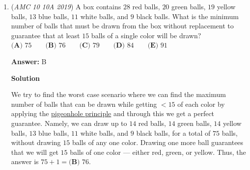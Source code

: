 \begin{enumerate}
 \textbf{Answer: }D



\textbf{Solution 1}

Let $A$ be the age of Ana and $B$ be the age of Bonita. Then,

 
 \[A-1 = 5(B-1)\]and
 \[A = B^2.\]

 Substituting the second equation into the first gives us

 
 \[B^2-1 = 5(B-1).\]

 By using difference of squares and dividing, $B=4.$ Moreover, $A=B^2=16.$

 The answer is $16-4 = \boxed{\textbf{(D) }12}$.

 



\textbf{Solution 2 (Guess and Check)}

Simple guess and check works. Start with all the square numbers - $1$, $4$, $9$, $16$, $25$, $36$, etc. (probably stop at around $100$ since at that point it wouldn't make sense). If Ana is $9$, then Bonita is $3$, so in the previous year, Ana's age was $4$ times greater than Bonita's. If Ana is $16$, then Bonita is $4$, and Ana's age was $5$ times greater than Bonita's in the previous year, as required. The difference in the ages is $16 - 4 = \boxed{\textbf{(D) }12}$.

 



\textbf{Solution 3 (Answer Choices)}

The second sentence of the problem says that Ana's age was once $5$ times Bonita's age. Therefore, the difference of the ages $n$ must be divisible by $4.$ The only answer choice which is divisible by $4$ is $\boxed{\textbf{(D) }12}$.

 


	\item (\textit{AMC 10 10A 2019}) A box contains $28$ red balls, $20$ green balls, $19$ yellow balls, $13$ blue balls, $11$ white balls, and $9$ black balls. What is the minimum number of balls that must be drawn from the box without replacement to guarantee that at least $15$ balls of a single color will be drawn$?$
$\textbf{(A) } 75 \qquad\textbf{(B) } 76 \qquad\textbf{(C) } 79 \qquad\textbf{(D) } 84 \qquad\textbf{(E) } 91$

 \textbf{Answer: }B



\textbf{Solution}

We try to find the worst case scenario where we can find the maximum number of balls that can be drawn while getting $<15$ of each color by applying the \href{https://artofproblemsolving.com/wiki/index.php?title=Pigeonhole\_principle}{pigeonhole principle} and through this we get a perfect guarantee. Namely, we can draw up to $14$ red balls, $14$ green balls, $14$ yellow balls, $13$ blue balls, $11$ white balls, and $9$ black balls, for a total of $75$ balls, without drawing $15$ balls of any one color. Drawing one more ball guarantees that we will get $15$ balls of one color — either red, green, or yellow. Thus, the answer is $75 + 1 = \boxed{\textbf{(B) } 76}$.


\end{enumerate}
